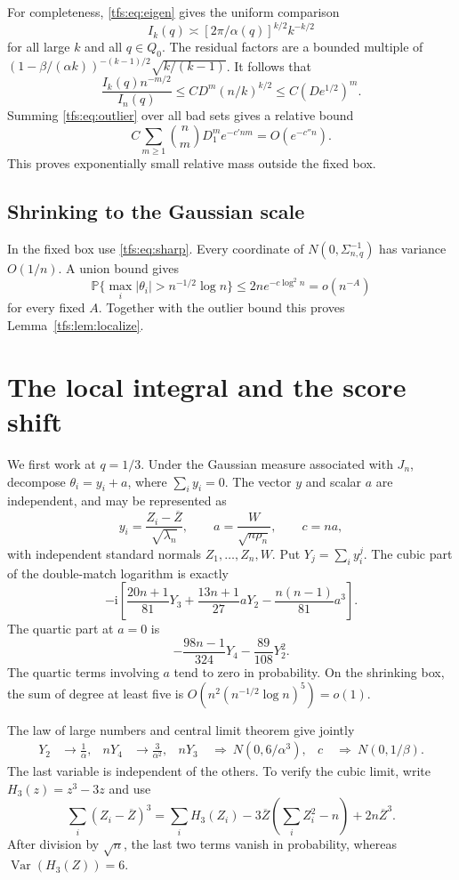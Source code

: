 \documentclass[11pt,a4paper]{article}
\numberwithin{equation}{section}
\theoremstyle{remark}
\newcommand{\Prob}{\mathbb P}
\newcommand{\1}{\mathbf 1}
\newcommand{\ii}{\mathrm i}
\newcommand{\Var}{\operatorname{Var}}
\begin{document}
For completeness, \eqref{tfs:eq:eigen} gives the uniform comparison
\[
I_k(q)\asymp [2\pi/\alpha(q)]^{k/2}k^{-k/2}
\]
for all large $k$ and all $q\in Q_0$.
The residual factors are a bounded multiple of
$(1-\beta/(\alpha k))^{-(k-1)/2}\sqrt{k/(k-1)}$.
It follows that
\[
\frac{I_k(q)n^{-m/2}}{I_n(q)}
 \leq C D^m(n/k)^{k/2}\leq C(De^{1/2})^m.
\]
Summing \eqref{tfs:eq:outlier} over all bad sets gives a relative bound
\[
C\sum_{m\geq1}\binom nm D_1^m e^{-c'nm}=O(e^{-c''n}).
\]
This proves exponentially small relative mass outside the fixed box.

\subsection{Shrinking to the Gaussian scale}
In the fixed box use \eqref{tfs:eq:sharp}. Every coordinate of
$N(0,\Sigma_{n,q}^{-1})$ has variance $O(1/n)$. A union bound gives
\[
\Prob\{\max_i|\theta_i|>n^{-1/2}\log n\}
                    \leq 2n e^{-c\log^2 n}=o(n^{-A})
\]
for every fixed $A$. Together with the outlier bound this proves
Lemma~\ref{tfs:lem:localize}.

\section{The local integral and the score shift}\label{tfs:sec:local}
We first work at $q=1/3$. Under the Gaussian measure associated with
$J_n$, decompose $\theta_i=y_i+a$, where $\sum_i y_i=0$. The vector $y$
and scalar $a$ are independent, and may be represented as
\[
y_i=\frac{Z_i-\overline Z}{\sqrt{\lambda_n}},\qquad
 a=\frac{W}{\sqrt{n\rho_n}},\qquad c=na,
\]
with independent standard normals $Z_1,\ldots,Z_n,W$. Put
$Y_j=\sum_i y_i^j$. The cubic part of the double-match logarithm is exactly
\begin{equation}\label{tfs:eq:cubic}
-\ii\left[\frac{20n+1}{81}Y_3+
           \frac{13n+1}{27}aY_2-\frac{n(n-1)}{81}a^3\right].
\end{equation}
The quartic part at $a=0$ is
\begin{equation}\label{tfs:eq:quartagg}
-\frac{98n-1}{324}Y_4-\frac{89}{108}Y_2^2.
\end{equation}
The quartic terms involving $a$ tend to zero in probability.
On the shrinking box, the sum of degree at least five is
$O(n^2(n^{-1/2}\log n)^5)=o(1)$.

The law of large numbers and central limit theorem give jointly
\begin{align}\label{tfs:eq:limits}
Y_2&\longrightarrow\frac1\alpha,&
 nY_4&\longrightarrow\frac3{\alpha^2},&
 nY_3&\ \Rightarrow\ N(0,6/\alpha^3),&
 c&\ \Rightarrow\ N(0,1/\beta).
\end{align}
The last variable is independent of the others. To verify the cubic limit,
write $H_3(z)=z^3-3z$ and use
\[
\sum_i(Z_i-\overline Z)^3
 =\sum_iH_3(Z_i)-3\overline Z\left(\sum_iZ_i^2-n\right)
                                      +2n\overline Z^3.
\]
After division by $\sqrt n$, the last two terms vanish in probability,
whereas $\Var(H_3(Z))=6$.
\end{document}
